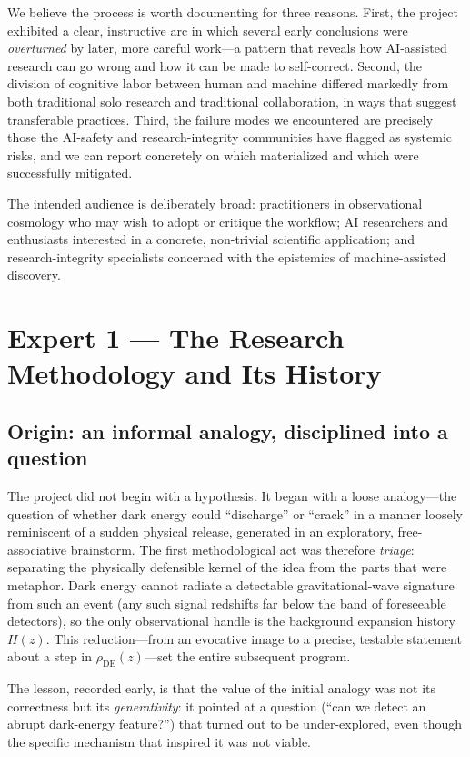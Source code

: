 \documentclass[11pt]{article}
\newcommand{\rhoDE}{\rho_{\mathrm{DE}}}
\begin{document}
We believe the process is worth documenting for three reasons. First, the project
exhibited a clear, instructive arc in which several early conclusions were
\emph{overturned} by later, more careful work---a pattern that reveals how
AI-assisted research can go wrong and how it can be made to self-correct. Second,
the division of cognitive labor between human and machine differed markedly from
both traditional solo research and traditional collaboration, in ways that suggest
transferable practices. Third, the failure modes we encountered are precisely those
the AI-safety and research-integrity communities have flagged as systemic risks,
and we can report concretely on which materialized and which were successfully
mitigated.

The intended audience is deliberately broad: practitioners in observational
cosmology who may wish to adopt or critique the workflow; AI researchers and
enthusiasts interested in a concrete, non-trivial scientific application; and
research-integrity specialists concerned with the epistemics of machine-assisted
discovery.

\section{Expert 1 --- The Research Methodology and Its History}
\label{sec:history}

\subsection{Origin: an informal analogy, disciplined into a question}

The project did not begin with a hypothesis. It began with a loose analogy---the
question of whether dark energy could ``discharge'' or ``crack'' in a manner
loosely reminiscent of a sudden physical release, generated in an exploratory,
free-associative brainstorm. The first methodological act was therefore
\emph{triage}: separating the physically defensible kernel of the idea from the
parts that were metaphor. Dark energy cannot radiate a detectable gravitational-wave
signature from such an event (any such signal redshifts far below the band of
foreseeable detectors), so the only observational handle is the background
expansion history $H(z)$. This reduction---from an evocative image to a precise,
testable statement about a step in $\rhoDE(z)$---set the entire subsequent
program.

The lesson, recorded early, is that the value of the initial analogy was not its
correctness but its \emph{generativity}: it pointed at a question
(``can we detect an abrupt dark-energy feature?'') that turned out to be
under-explored, even though the specific mechanism that inspired it was not viable.
\end{document}
